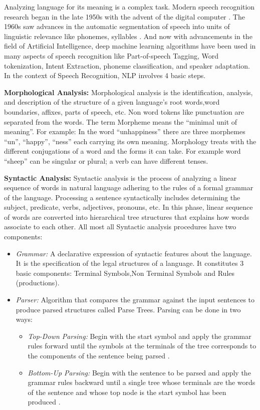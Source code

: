 \documentclass[sigconf]{acmart}
\begin{document}
Analyzing language for its meaning is a complex task. Modern speech recognition research began in the late 1950s with the advent of the digital computer \cite{Jacqueline}. The 1960s saw advances in the automatic segmentation of speech into units of linguistic relevance like phonemes, syllables \cite{Peacocke}. And now with advancements in the field of Artificial Intelligence, deep machine learning algorithms have been used in many aspects of speech recognition like Part-of-speech Tagging, Word tokenization, Intent Extraction, phoneme classification, and speaker adaptation. In the context of Speech Recognition, NLP involves 4 basic steps.
\par\null\par
\textbf{Morphological Analysis:}
     Morphological analysis is the identification, analysis, and description of the structure of a given language's root words,word boundaries, affixes, parts of speech, etc. Non word tokens like punctuation are separated from the words. The term Morpheme means the ``minimal unit of meaning''. For example: In the  word ``unhappiness'' there are three morphemes ``un'', ``happy'', ``ness'' each carrying its own meaning. Morphology treats with the different conjugations of a word and the forms it can take. For example word ``sheep'' can be singular or plural; a verb can have different tenses. 
\par\null\par
\textbf{Syntactic Analysis:}
     Syntactic analysis is the process of analyzing a linear sequence of words in natural language adhering to the rules of a formal grammar of the language. Processing a sentence syntactically includes determining the subject, predicate, verbs, adjectives, pronouns, etc. In this phase, linear sequence of words are converted into hierarchical tree structures that explains how words associate to each other. All most all Syntactic analysis procedures have two components:
     \begin{itemize}
     \item\textit{Grammar:} A declarative expression of syntactic features about the language. It is the specification of the legal structures of a language. It constitutes 3 basic components: Terminal Symbols,Non Terminal Symbols and Rules (productions).
     \item\textit{Parser:} Algorithm that compares the grammar against the input sentences to produce parsed structures called Parse Trees. Parsing can be done in two ways:
      \begin{itemize}
      \item\textit{Top-Down Parsing:} Begin with the start symbol and apply the grammar rules forward until the symbols at the terminals of the tree corresponds to the components of the sentence being parsed \cite{Chakraborty}. 
      \item\textit{Bottom-Up Parsing:} Begin with the sentence to be parsed and apply the grammar rules backward until a single tree whose terminals are the words of the sentence and whose top node is the start symbol has been produced \cite{Chakraborty}. 
      \end{itemize}
     \end{itemize}
\end{document}
